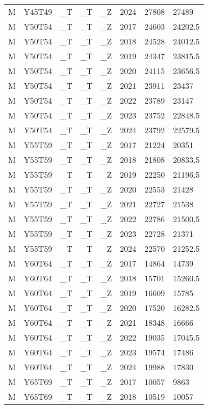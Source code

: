 \begin{longtable}[t]{llllllll}
\addlinespace
M & Y45T49 & \_T & \_T & \_Z & 2024 & 27808 & 27489\\
M & Y50T54 & \_T & \_T & \_Z & 2017 & 24603 & 24202.5\\
M & Y50T54 & \_T & \_T & \_Z & 2018 & 24528 & 24012.5\\
M & Y50T54 & \_T & \_T & \_Z & 2019 & 24347 & 23815.5\\
M & Y50T54 & \_T & \_T & \_Z & 2020 & 24115 & 23656.5\\
\addlinespace
M & Y50T54 & \_T & \_T & \_Z & 2021 & 23911 & 23437\\
M & Y50T54 & \_T & \_T & \_Z & 2022 & 23789 & 23147\\
M & Y50T54 & \_T & \_T & \_Z & 2023 & 23752 & 22848.5\\
M & Y50T54 & \_T & \_T & \_Z & 2024 & 23792 & 22579.5\\
M & Y55T59 & \_T & \_T & \_Z & 2017 & 21224 & 20351\\
\addlinespace
M & Y55T59 & \_T & \_T & \_Z & 2018 & 21808 & 20833.5\\
M & Y55T59 & \_T & \_T & \_Z & 2019 & 22250 & 21196.5\\
M & Y55T59 & \_T & \_T & \_Z & 2020 & 22553 & 21428\\
M & Y55T59 & \_T & \_T & \_Z & 2021 & 22727 & 21538\\
M & Y55T59 & \_T & \_T & \_Z & 2022 & 22786 & 21500.5\\
\addlinespace
M & Y55T59 & \_T & \_T & \_Z & 2023 & 22728 & 21371\\
M & Y55T59 & \_T & \_T & \_Z & 2024 & 22570 & 21252.5\\
M & Y60T64 & \_T & \_T & \_Z & 2017 & 14864 & 14739\\
M & Y60T64 & \_T & \_T & \_Z & 2018 & 15701 & 15260.5\\
M & Y60T64 & \_T & \_T & \_Z & 2019 & 16609 & 15785\\
\addlinespace
M & Y60T64 & \_T & \_T & \_Z & 2020 & 17520 & 16282.5\\
M & Y60T64 & \_T & \_T & \_Z & 2021 & 18348 & 16666\\
M & Y60T64 & \_T & \_T & \_Z & 2022 & 19035 & 17045.5\\
M & Y60T64 & \_T & \_T & \_Z & 2023 & 19574 & 17486\\
M & Y60T64 & \_T & \_T & \_Z & 2024 & 19988 & 17830\\
\addlinespace
M & Y65T69 & \_T & \_T & \_Z & 2017 & 10057 & 9863\\
M & Y65T69 & \_T & \_T & \_Z & 2018 & 10519 & 10057\\

\end{longtable}

